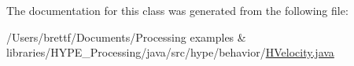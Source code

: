 The documentation for this class was generated from the following file\-:\begin{DoxyCompactItemize}
\item 
/\-Users/brettf/\-Documents/\-Processing examples \& libraries/\-H\-Y\-P\-E\-\_\-\-Processing/java/src/hype/behavior/\hyperlink{_h_velocity_8java}{H\-Velocity.\-java}\end{DoxyCompactItemize}
